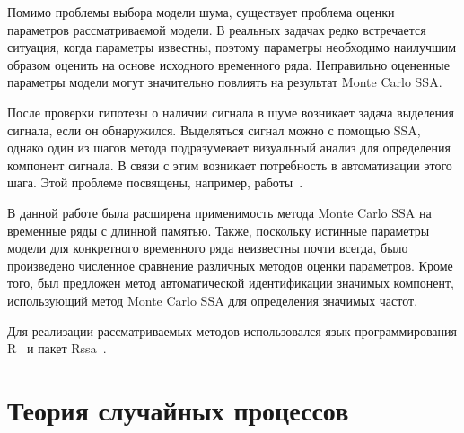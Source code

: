 \documentclass[specialist,
substylefile = spbu_report.rtx,
subf,href,colorlinks=true, 12pt]{disser}
\theoremstyle{definition}
\begin{document}
Помимо проблемы выбора модели шума, существует проблема оценки параметров рассматриваемой модели. В реальных задачах редко встречается ситуация, когда параметры известны, поэтому параметры необходимо наилучшим образом оценить на основе исходного временного ряда. Неправильно оцененные параметры модели могут значительно повлиять на результат Monte Carlo SSA.

После проверки гипотезы о наличии сигнала в шуме возникает задача выделения сигнала, если он обнаружился. Выделяться сигнал можно с помощью SSA, однако один из шагов метода подразумевает визуальный анализ для определения компонент сигнала. В связи с этим возникает потребность в автоматизации этого шага. Этой проблеме посвящены, например, работы~\cite{Alexandrov2009, Kalantari2019, Bogalo2021, autoSSA}.

В данной работе была расширена применимость метода Monte Carlo SSA на временные ряды с длинной памятью. Также, поскольку истинные параметры модели для конкретного временного ряда неизвестны почти всегда, было произведено численное сравнение различных методов оценки параметров. Кроме того, был предложен метод автоматической идентификации значимых компонент, использующий метод Monte Carlo SSA для определения значимых частот.

Для реализации рассматриваемых методов использовался язык программирования \textsf{R}~\cite{R} и пакет \textsf{Rssa}~\cite{SSA_R}.


\chapter{Теория случайных процессов}\label{chpt:processes}
\end{document}
